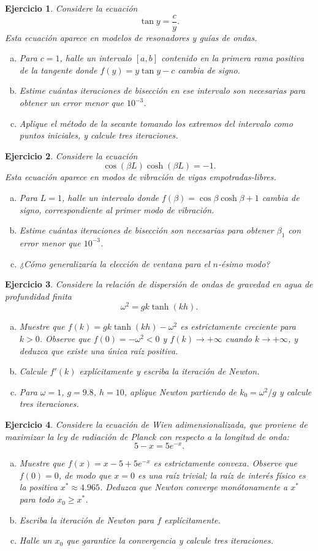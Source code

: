 \documentclass[12pt]{article}
\newtheorem{exercise}{Ejercicio}
\newcommand{\bej}{\begin{exercise}\rm}
\newcommand{\fej}{\end{exercise}}
\begin{document}
\bej Considere la ecuación
\[
\tan y=\frac{c}{y}.
\]
Esta ecuación aparece en modelos de resonadores y guías de ondas.
\begin{enumerate}[(a)]
\item Para $c=1$, halle un intervalo $[a,b]$ contenido en la primera rama positiva de la tangente donde $f(y)=y\tan y-c$ cambia de signo.
\item Estime cuántas iteraciones de bisección en ese intervalo son necesarias para obtener un error menor que $10^{-3}$.
\item Aplique el método de la secante tomando los extremos del intervalo como puntos iniciales, y calcule tres iteraciones.
\end{enumerate}
\fej

\bej Considere la ecuación
\[
\cos(\beta L)\cosh(\beta L)=-1.
\]
Esta ecuación aparece en modos de vibración de vigas empotradas-libres.
\begin{enumerate}[(a)]
\item Para $L=1$, halle un intervalo donde $f(\beta)=\cos\beta\cosh\beta+1$ cambia de signo, correspondiente al primer modo de vibración.
\item Estime cuántas iteraciones de bisección son necesarias para obtener $\beta_1$ con error menor que $10^{-3}$.
\item ¿Cómo generalizaría la elección de ventana para el $n$-ésimo modo?
\end{enumerate}
\fej

\bej Considere la relación de dispersión de ondas de gravedad en agua de profundidad finita
\[
\omega^2=gk\tanh(kh).
\]
\begin{enumerate}[(a)]
\item Muestre que $f(k)=gk\tanh(kh)-\omega^2$ es estrictamente creciente para $k>0$. Observe que $f(0)=-\omega^2<0$ y $f(k)\to+\infty$ cuando $k\to+\infty$, y deduzca que existe una única raíz positiva.
\item Calcule $f'(k)$ explícitamente y escriba la iteración de Newton.
\item Para $\omega=1$, $g=9.8$, $h=10$, aplique Newton partiendo de $k_0=\omega^2/g$ y calcule tres iteraciones.
\end{enumerate}
\fej

\bej Considere la ecuación de Wien adimensionalizada, que proviene de maximizar la ley de radiación de Planck con respecto a la longitud de onda:
\[
5-x=5e^{-x}.
\]
\begin{enumerate}[(a)]
\item Muestre que $f(x)=x-5+5e^{-x}$ es estrictamente convexa. Observe que $f(0)=0$, de modo que $x=0$ es una raíz trivial; la raíz de interés físico es la positiva $x^*\approx 4.965$. Deduzca que Newton converge monótonamente a $x^*$ para todo $x_0\ge x^*$.
\item Escriba la iteración de Newton para $f$ explícitamente.
\item Halle un $x_0$ que garantice la convergencia y calcule tres iteraciones.
\end{enumerate}
\fej
\end{document}
